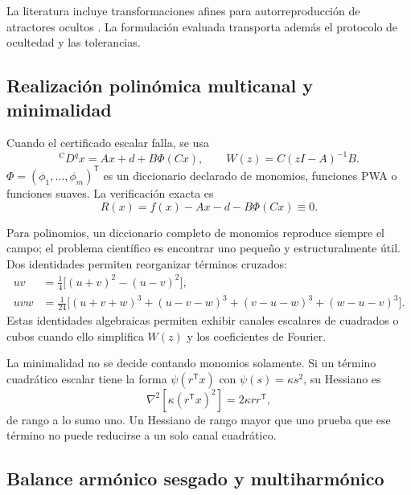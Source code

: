 \begin{remark}
La literatura incluye transformaciones afines para autorreproducción de
atractores ocultos \cite{sayed2020}. La formulación evaluada transporta además
el protocolo de ocultedad y las tolerancias.
\end{remark}

\subsection{Realización polinómica multicanal y minimalidad}
\label{sec:mimo-dictionary}

Cuando el certificado escalar falla, se usa
\begin{equation}
 {}^{\mathrm C}D^q x=Ax+d+B\Phi(Cx),
 \qquad
 W(z)=C(zI-A)^{-1}B.
 \label{eq:th-mimo}
\end{equation}
\(\Phi=(\phi_1,\ldots,\phi_m)^{\mathsf T}\) es un diccionario declarado de
monomios, funciones PWA o funciones suaves. La verificación exacta es
\[
 R(x)=f(x)-Ax-d-B\Phi(Cx)\equiv0.
\]

Para polinomios, un diccionario completo de monomios reproduce siempre el
campo; el problema científico es encontrar uno pequeño y estructuralmente
útil. Dos identidades permiten reorganizar términos cruzados:
\begin{align}
 uv&=\frac14\bigl[(u+v)^2-(u-v)^2\bigr],
 \label{eq:th-square-polarization}\\
 uvw&=\frac1{24}\bigl[(u+v+w)^3+(u-v-w)^3
 +(v-u-w)^3+(w-u-v)^3\bigr].
 \label{eq:th-cubic-polarization}
\end{align}
Estas identidades algebraicas permiten exhibir canales escalares de cuadrados
o cubos cuando ello simplifica
\(W(z)\) y los coeficientes de Fourier.

La minimalidad no se decide contando monomios solamente. Si un término
cuadrático escalar tiene la forma \(\psi(r^{\mathsf T}x)\) con
\(\psi(s)=\kappa s^2\), su Hessiano es
\[
 \nabla^2[\kappa(r^{\mathsf T}x)^2]=2\kappa rr^{\mathsf T},
\]
de rango a lo sumo uno. Un Hessiano de rango mayor que uno prueba que ese
término no puede reducirse a un solo canal cuadrático.

\subsection{Balance armónico sesgado y multiharmónico}
\label{sec:multiharmonic}

